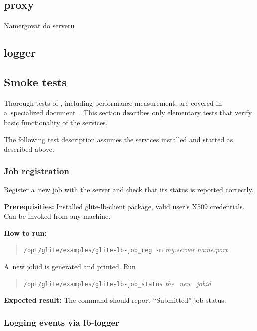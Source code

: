 \subsection{\LB proxy}

Namergovat do serveru

\subsection{\LB logger}


\subsection{Smoke tests}


Thorough tests of \LB, including performance measurement, are
covered in a~specialized document~\cite{testplan}.
This section describes only elementary tests that verify basic
functionality of the services.

The following test description assumes the \LB services installed
and started as described above.

\def\req{\noindent\textbf{Prerequisities:}\xspace}
\def\how{\noindent\textbf{How to run:}\xspace}
\def\result{\noindent\textbf{Expected result:}\xspace}

\subsubsection{Job registration}

Register a~new job with the \LB server and check that its status is
reported correctly.

\req Installed glite-lb-client package, valid user's X509 credentials.
Can be invoked from any machine.

\how 
\begin{quote}
\verb'/opt/glite/examples/glite-lb-job_reg -m' \emph{my.server.name:port}
\end{quote}
A~new jobid is generated and printed.  Run 
\begin{quote}
\verb'/opt/glite/examples/glite-lb-job_status' \emph{the\_\/new\_\/jobid}
\end{quote}

\result
The command should report ``Submitted'' job status.

\subsubsection{Logging events via lb-logger}

